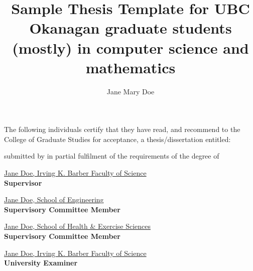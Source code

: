 \documentclass[msc,oneside]{ubcthesis}%
\title{Sample Thesis Template for UBC Okanagan graduate students (mostly) in computer science and mathematics}
\author{Jane Mary Doe} %
\begin{document}
\frontmatter                    %

\maketitle                      %

\makeatletter
The following individuals certify that they have read, and recommend to the College of Graduate Studies for acceptance, a thesis/dissertation entitled:

\vspace{2ex}

\textsc{\ul\@title}


\vspace{1ex}

\noindent submitted by \underline{\sc \@author} in partial fulfilment of the requirements of the degree of \underline{\@degreetitle}
\makeatother

\newlength{\linespace}
\setlength{\linespace}{.75cm} %
\vspace{2\linespace}\smaller

\noindent\underline{Jane Doe, Irving K. Barber Faculty of Science} 
\\
\textbf{Supervisor}

\vspace{\linespace}

\noindent\underline{Jane Doe, School of Engineering} 
\\
\textbf{Supervisory Committee Member}

\vspace{\linespace}

\noindent\underline{Jane Doe, School of Health \& Exercise Sciences} 
\\
\textbf{Supervisory Committee Member}

\vspace{\linespace}

\noindent\underline{Jane Doe, Irving K. Barber Faculty of Science} 
\\
\textbf{University Examiner}
\end{document}
